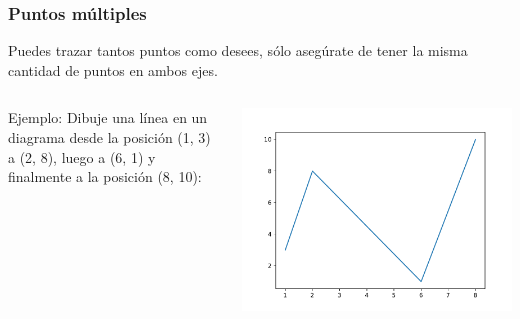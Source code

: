 \begin{frame}[fragile]
  \frametitle{Puntos múltiples}

  \vspace{\baselineskip}
  Puedes trazar tantos puntos como desees, sólo asegúrate de
  tener la misma cantidad de puntos en ambos ejes.
  \begin{columns}
        \begin{exampleblock}{Ejemplo:}
          Dibuje una línea en un diagrama desde la posición
          (1, 3) a (2, 8), luego a (6, 1) y finalmente a
          la posición (8, 10):
          
        \end{exampleblock}
      \pausa
      \parbox{\textwidth}{\includegraphics[width=\linewidth]{ejemplos/e04.pdf}}
  \end{columns}
\end{frame}

